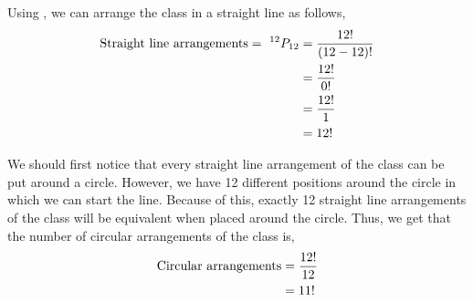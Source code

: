 %
%


\begin{subquestions}
	
\subquestion

\begin{subsubquestions}
	
\subsubquestion

Using , we can arrange the class in a straight line as follows,
\begin{align}
	\text{Straight line arrangements} = ~^{12}P_{12} & = \frac{12!}{(12-12)!} \nonumber \\
	            & = \frac{12!}{0!} \nonumber \\
	            & = \frac{12!}{1} \nonumber \\
	            & = 12!
\end{align}
	

\subsubquestion

We should first notice that every straight line arrangement of the class can be put around a circle. However, we have 12 different positions around the circle in which we can start the line. Because of this, exactly 12 straight line arrangements of the class will be equivalent when placed around the circle. Thus, we get that the number of circular arrangements of the class is,
\begin{align}
	\text{Circular arrangements} & = \frac{12!}{12} \nonumber \\
	& = 11! 
\end{align}
	

\subsubquestion 	
	

\end{subsubquestions}
\end{subquestions}
